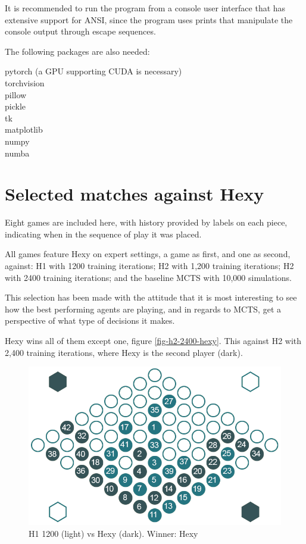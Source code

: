 It is recommended to run the program from a console user interface that has extensive support for ANSI, since the program uses prints that manipulate the console output through escape sequences.

The following packages are also needed:
\begin{ttfamily}

pytorch (a GPU supporting CUDA is necessary)\\
torchvision\\
pillow\\
pickle\\
tk\\
matplotlib\\
numpy\\
numba\\
\end{ttfamily}
\clearpage
\section{Selected matches against Hexy}
Eight games are included here, with history provided by labels on each piece, indicating when in the sequence of play it was placed.

All games feature Hexy on expert settings, a game as first, and one as second, against: H1 with 1200 training iterations; H2 with 1,200 training iterations; H2 with 2400 training iterations; and the baseline MCTS with 10,000 simulations.

This selection has been made with the attitude that it is most interesting to see how the best performing agents are playing, and in regards to MCTS, get a perspective of what type of decisions it makes.

Hexy wins all of them except one, figure \ref{fig-h2-2400-hexy}. This against H2 with 2,400 training iterations, where Hexy is the second player (dark).

\begin{figure}[ht]
	\centering
	\includegraphics[width=.75\textwidth]{graphics/games/h1-1200-hexy.png}
	\caption{H1 1200 (light) vs Hexy (dark). Winner: Hexy}
	\label{fig-h1-1200-hexy}
\end{figure}
\vspace{1cm}

